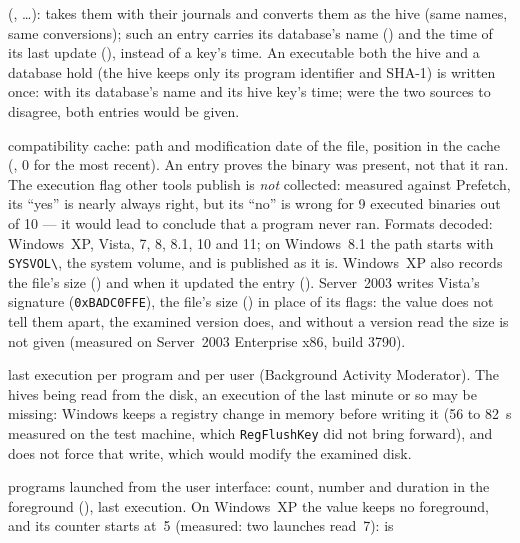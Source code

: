 \documentclass[11pt,a4paper,oneside]{report}
\begin{document}
\begin{description}[style=nextline,leftmargin=1.2em]
        (, …):
        \wac{} takes them with their journals and converts them as the hive
        (same names, same conversions); such an entry carries its database's
        name () and the time of its last update
        (), instead of a key's time. An executable both
        the hive and a database hold (the hive keeps only its program
        identifier and SHA-1) is written once: with its database's name and
        its hive key's time; were the two sources to disagree, both entries
        would be given.
  \item[\fichier{shimcache.json}] compatibility cache: path and modification date
        of the file, position in the cache (, 0 for the most
        recent). An entry proves the binary was present, not that it ran. The
        execution flag other tools publish is \emph{not} collected: measured
        against Prefetch, its ``yes'' is nearly always right, but its ``no'' is
        wrong for 9 executed binaries out of 10 — it would lead to conclude that
        a program never ran. Formats decoded: Windows~XP, Vista, 7, 8, 8.1, 10 and 11; on
        Windows~8.1 the path starts with \texttt{SYSVOL\textbackslash}, the system
        volume, and is published as it is. Windows~XP also records the file's
        size () and when it updated the entry
        (). Server~2003 writes Vista's signature
        (\texttt{0xBADC0FFE}), the file's size () in place of
        its flags: the value does not tell them apart, the examined version
        does, and without a version read the size is not given (measured on
        Server~2003 Enterprise x86, build 3790).
  \item[\fichier{bams.json}] last execution per program and per user
        (Background Activity Moderator). The hives being read from the disk,
        an execution of the last minute or so may be missing: Windows keeps a
        registry change in memory before writing it (56 to 82~s measured on
        the test machine, which \texttt{RegFlushKey} did not bring forward),
        and \wac{} does not force that write, which would modify the examined
        disk.
  \item[\fichier{userassists.json}] programs launched from the user interface:
        count, number and duration in the foreground (), last
        execution. On Windows~XP the value keeps no foreground, and its
        counter starts at~5 (measured: two launches read~7):  is

\end{description}
\end{document}
